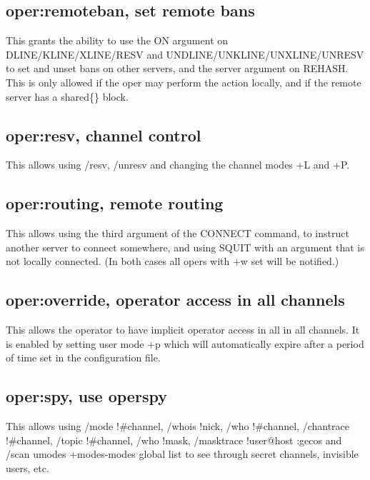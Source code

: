 \subsection{oper:remoteban, set remote bans}

	This grants the ability to use the ON argument on
	DLINE/KLINE/XLINE/RESV and UNDLINE/UNKLINE/UNXLINE/UNRESV to set and
	unset bans on other servers, and the server argument on REHASH. This
	is only allowed if the oper may perform the action locally, and if the
	remote server has a shared\{\} block.


\subsection{oper:resv, channel control}

	This allows using /resv, /unresv and changing the channel modes +L and
	+P.


\subsection{oper:routing, remote routing}

	This allows using the third argument of the CONNECT command, to
	instruct another server to connect somewhere, and using SQUIT with an
	argument that is not locally connected. (In both cases all opers with
	+w set will be notified.)


\subsection{oper:override, operator access in all channels}

	This allows the operator to have implicit operator access in all
	in all channels. It is enabled by setting user mode +p which
	will automatically expire after a period of time set in the
	configuration file.


\subsection{oper:spy, use operspy}

	This allows using /mode !\#channel, /whois !nick, /who !\#channel,
	/chantrace !\#channel, /topic !\#channel, /who !mask, /masktrace
	!user@host :gecos and /scan umodes +modes-{}modes global list to see
	through secret channels, invisible users, etc.

